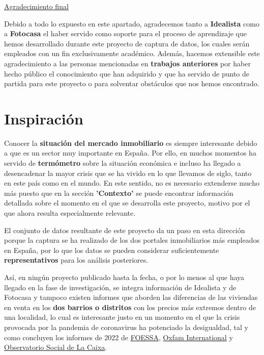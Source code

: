 \documentclass[12pt]{article}
\begin{document}
\underline{Agradecimiento final}

Debido a todo lo expuesto en este apartado, agradecemos tanto a \textbf{Idealista} como a \textbf{Fotocasa} el haber servido como soporte para el proceso de aprendizaje que hemos desarrollado durante este proyecto de captura de datos, los cuales serán empleados con un fin exclusivamente académico. Además, hacemos extensible este agradecimiento a las personas mencionadas en \textbf{trabajos anteriores} por haber hecho público el conocimiento que han adquirido y que ha servido de punto de partida para este proyecto o para solventar obstáculos que nos hemos encontrado. 

\vspace{-1.5em}\section{Inspiración }\vspace{-1.5em}

Conocer la \textbf{situación del mercado inmobiliario} es siempre interesante debido a que es un sector muy importante en España. Por ello, en muchos momentos ha servido de \textbf{termómetro} sobre la situación económica e incluso ha llegado a desencadenar la mayor crisis que se ha vivido en lo que llevamos de siglo, tanto en este país como en el mundo. En este sentido, no es necesario extenderse mucho más puesto que en la sección \textbf{'Contexto' }se puede encontrar información detallada sobre el momento en el que se desarrolla este proyecto, motivo por el que ahora resulta especialmente relevante.  

El conjunto de datos resultante de este proyecto da un paso en esta dirección porque la captura se ha realizado de los dos portales inmobiliarios más empleados en España, por lo que los datos se pueden considerar suficientemente \textbf{representativos} para los análisis posteriores. 

Así, en ningún proyecto publicado hasta la fecha, o por lo menos al que haya llegado en la fase de investigación, se integra información de Idealista y de Fotocasa y tampoco existen informes que aborden las diferencias de las viviendas en venta en los \textbf{dos barrios o distritos} con los precios más extremos dentro de una localidad, lo cual es interesante justo en un momento en el que la crisis provocada por la pandemia de coronavirus ha potenciado la desigualdad, tal y como concluyen los informes de 2022 de \href{https://www.foessa.es/blog/foessa-presenta-la-primera-radiografia-social-completa-de-la-crisis-de-la-covid-19-en-toda-espana/}{FOESSA}, \href{https://oxfamilibrary.openrepository.com/bitstream/handle/10546/621341/bp-inequality-kills-170122-es.pdf}{Oxfam International} y \href{https://elobservatoriosocial.fundacionlacaixa.org/documents/22890/492074/T01_ID_ES_AyalaCant%C3%B3.pdf/a0746431-109f-e009-6c77-296c378f0438?t=1642072938395}{Observatorio Social de La Caixa}.
\end{document}
